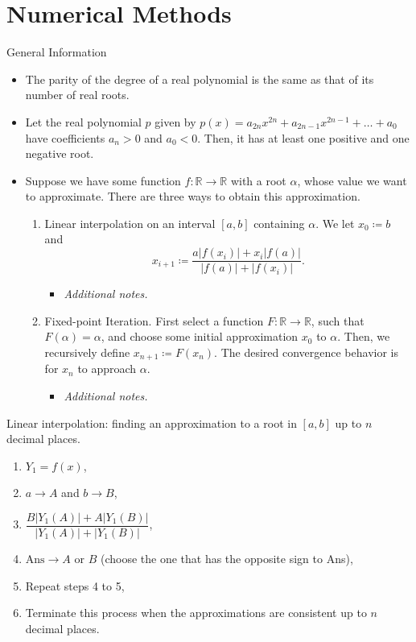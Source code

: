 \documentclass[../Notes.tex]{subfiles}
\begin{document}
\chapter{Numerical Methods}
\begin{stbox}{General Information}
    \begin{itemize}
        \item The parity of the degree of a real polynomial is the same as that of its number of real roots.
        \item Let the real polynomial \(p\) given by \(p(x)=a_{2n}x^{2n}+a_{2n-1}x^{2n-1}+\dots+a_0\) have coefficients \(a_n>0\) and \(a_0<0\). Then, it has at least one positive and one negative root.
        \item Suppose we have some function \(f \colon \mathbb{R}\to \mathbb{R}\) with a root \(\alpha\), whose value we want to approximate. There are three ways to obtain this approximation.
        \begin{enumerate}
            \item Linear interpolation on an interval \([a,b]\) containing \(\alpha\). We let \(x_0\coloneq b\) and
            \[x_{i+1}\coloneq\frac{a \lvert f(x_i) \rvert+x_i \lvert f(a) \rvert}{\lvert f(a) \rvert+\lvert f(x_i) \rvert}.\]
            \begin{itemize}
                \item \emph{Additional notes.}
            \end{itemize}
            \item Fixed-point Iteration. First select a function \(F \colon \mathbb{R}\to \mathbb{R}\), such that \(F(\alpha)=\alpha\), and choose some initial approximation \(x_0\) to \(\alpha\). Then, we recursively define \(x_{n+1} \coloneq F(x_n)\). The desired convergence behavior is for \(x_n\) to approach \(\alpha\).
            \begin{itemize}
                \item \emph{Additional notes.}
            \end{itemize}
        \end{enumerate}
    \end{itemize}
\end{stbox}
\begin{GCSkills}{}
    Linear interpolation: finding an approximation to a root in \([a,b]\) up to \(n\) decimal places.
    \begin{enumerate}
        \item \(Y_1=f(x)\),
        \item \(a \to A\) and \(b \to B\),
        \item \(\dfrac{B \lvert Y_1(A) \rvert+A \lvert Y_1(B) \rvert}{\lvert Y_1(A) \rvert+\lvert Y_1(B) \rvert}\),
        \item \(\text{Ans}\to A \text{ or } B\) (choose the one that has the opposite sign to Ans),
        \item Repeat steps 4 to 5,
        \item Terminate this process when the approximations are consistent up to \(n\) decimal places.
    \end{enumerate}
    \end{GCSkills}
\end{document}
